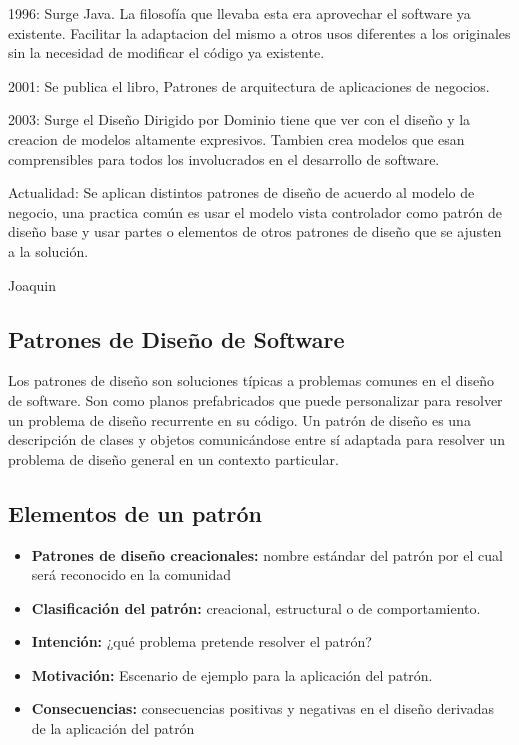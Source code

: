\documentclass[twoside,twocolumn]{article}
\begin{document}
1996: Surge Java. La filosofía que llevaba esta era aprovechar el software ya existente. Facilitar la adaptacion del mismo a otros usos diferentes a los originales sin la necesidad de modificar el código ya existente.

2001: Se publica el libro, Patrones de arquitectura de aplicaciones de negocios. 

2003: Surge el Diseño Dirigido por Dominio tiene que ver con el diseño y la creacion de modelos altamente expresivos. Tambien crea modelos que esan comprensibles para todos los involucrados en el desarrollo de software.

Actualidad: Se aplican distintos patrones de diseño de acuerdo al modelo de negocio, una practica común es usar el modelo vista controlador como patrón de diseño base y usar partes o elementos de otros patrones de diseño que se ajusten a la solución.

Joaquin



\subsection{ Patrones de Diseño de Software}
Los patrones de diseño son soluciones típicas a problemas comunes en el diseño de software. Son como planos prefabricados que puede personalizar para resolver un problema de diseño recurrente en su código.
Un patrón de diseño es una descripción de clases y objetos comunicándose entre sí adaptada para resolver un problema de diseño general en un contexto particular.\cite{Tanembaum3}

\subsection{ Elementos de un patrón}
\begin{itemize}
	\item \textbf{Patrones de diseño creacionales:} nombre estándar del patrón por el cual será reconocido en la comunidad \cite{Tanembaum1}
	\item \textbf{Clasificación del patrón:} creacional, estructural o de comportamiento.\cite{Tanembaum1}
	\item \textbf{Intención:} ¿qué problema pretende resolver el patrón?\cite{Tanembaum1}
	\item \textbf{Motivación:} Escenario de ejemplo para la aplicación del patrón.\cite{Tanembaum1}
	\item \textbf{Consecuencias:} consecuencias positivas y negativas en el diseño derivadas de la aplicación del patrón\cite{Tanembaum1}	
\end{itemize}
\end{document}
